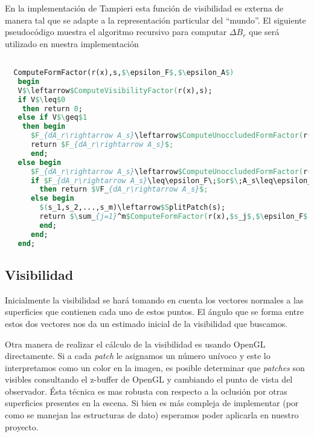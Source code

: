 \documentclass[letterpaper]{article}
\begin{document}
En la implementación de Tampieri \cite{ggems3} esta función de
visibilidad es externa de manera tal que se adapte a la representación
particular del ``mundo''. El siguiente pseudocódigo muestra el
algoritmo recursivo para computar $\Delta B_r$ que será utilizado en
nuestra implementación


\pagebreak{}
\begin{lstlisting}[language=Pascal,frame=single,caption=Cómputo de form-factors,mathescape=True]

  ComputeFormFactor(r(x),s,$\epsilon_F$,$\epsilon_A$)
   begin 
   V$\leftarrow$ComputeVisibilityFactor(r(x),s);
   if V$\leq$0
    then return 0;
   else if V$\geq$1
    then begin
      $F_{dA_r\rightarrow A_s}\leftarrow$ComputeUnoccludedFormFactor(r(x),s);
      return $F_{dA_r\rightarrow A_s}$;
      end;
   else begin
      $F_{dA_r\rightarrow A_s}\leftarrow$ComputeUnoccludedFormFactor(r(x),s);
      if $F_{dA_r\rightarrow A_s}\leq\epsilon_F\;$or$\;A_s\leq\epsilon_A$
        then return $VF_{dA_r\rightarrow A_s}$;
      else begin
        $(s_1,s_2,...,s_m)\leftarrow$SplitPatch(s);
        return $\sum_{j=1}^m$ComputeFormFactor(r(x),$s_j$,$\epsilon_F$,$\epsilon_A$);
        end;
      end;
   end;
\end{lstlisting}

\subsection{Visibilidad}
\label{sec:vis}

Inicialmente la visibilidad se hará tomando en cuenta los vectores
normales a las superficies que contienen cada uno de estos puntos. El
ángulo que se forma entre estos dos vectores nos da un estimado
inicial de la visibilidad que buscamos.

Otra manera de realizar el cálculo de la visibilidad es usando OpenGL
directamente. Si a cada \textsl{patch} le asignamos un número unívoco
y este lo interpretamos como un color en la imagen, es posible
determinar que \textsl{patches} son visibles consultando el z-buffer
de OpenGL y cambiando el punto de vista del observador. Ésta técnica
es mas robusta con respecto a la oclusión por otras superficies
presentes en la escena. Si bien es más compleja de implementar (por
como se manejan las estructuras de dato) esperamos poder aplicarla en
nuestro proyecto.
\end{document}
